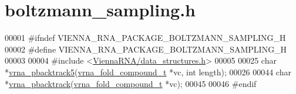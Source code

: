 \hypertarget{boltzmann__sampling_8h_source}{}\section{boltzmann\+\_\+sampling.\+h}
\label{boltzmann__sampling_8h_source}

\begin{DoxyCode}
00001 \textcolor{preprocessor}{#ifndef VIENNA\_RNA\_PACKAGE\_BOLTZMANN\_SAMPLING\_H}
00002 \textcolor{preprocessor}{#define VIENNA\_RNA\_PACKAGE\_BOLTZMANN\_SAMPLING\_H}
00003 
00004 \textcolor{preprocessor}{#include <\hyperlink{data__structures_8h}{ViennaRNA/data\_structures.h}>}
00005 
00025 \textcolor{keywordtype}{char}    *\hyperlink{group__subopt__stochbt_ga5a3e11d3ce121b5b045cb57f86a8ed05}{vrna\_pbacktrack5}(\hyperlink{group__fold__compound_structvrna__fc__s}{vrna\_fold\_compound\_t} *vc, \textcolor{keywordtype}{int} length);
00026 
00044 \textcolor{keywordtype}{char}    *\hyperlink{group__subopt__stochbt_ga0429de82e75af6c6e7508f4d273a192f}{vrna\_pbacktrack}(\hyperlink{group__fold__compound_structvrna__fc__s}{vrna\_fold\_compound\_t} *vc);
00045 
00046 \textcolor{preprocessor}{#endif}
\end{DoxyCode}
